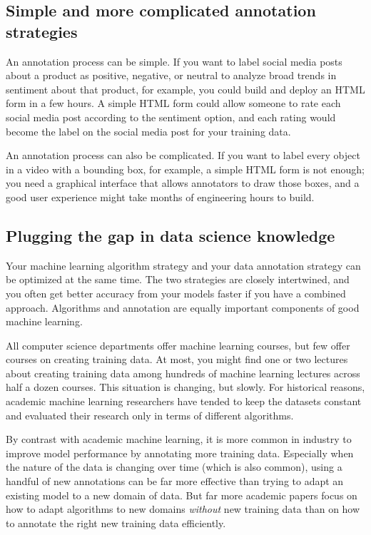 \documentclass[sigconf,nonacm,screen,pbalance]{acmart}
\begin{document}
\subsection{Simple and more complicated annotation strategies}

An annotation process can be simple. If you want to label social media posts about a product as positive, negative, or neutral to analyze broad trends in sentiment about that product, for example, you could build and deploy an HTML form in a few hours. A simple HTML form could allow someone to rate each social media post according to the sentiment option, and each rating would become the label on the social media post for your training data.

An annotation process can also be complicated. If you want to label every object in a video with a bounding box, for example, a simple HTML form is not enough; you need a graphical interface that allows annotators to draw those boxes, and a good user experience might take months of engineering hours to build.

\subsection{Plugging the gap in data science knowledge}
Your machine learning algorithm strategy and your data annotation strategy can be optimized at the same time. The two strategies are closely intertwined, and you often get better accuracy from your models faster if you have a combined approach. Algorithms and annotation are equally important components of good machine learning.

All computer science departments offer machine learning courses, but few offer courses on creating training data. At most, you might find one or two lectures about creating training data among hundreds of machine learning lectures across half a dozen courses. This situation is changing, but slowly. For historical reasons, academic machine learning researchers have tended to keep the datasets constant and evaluated their research only in terms of different algorithms.

By contrast with academic machine learning, it is more common in industry to improve model performance by annotating more training data. Especially when the nature of the data is changing over time (which is also common), using a handful of new annotations can be far more effective than trying to adapt an existing model to a new domain of data. But far more academic papers focus on how to adapt algorithms to new domains {\em without} new training data than on how to annotate the right new training data efficiently.
\end{document}
